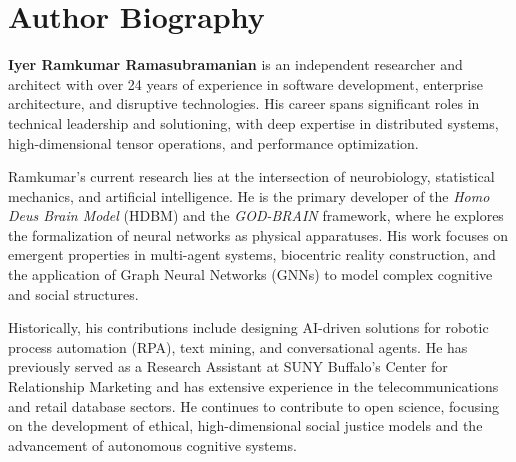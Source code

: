 \documentclass[12pt]{article}
\begin{document}
\section*{Author Biography}

\noindent \textbf{Iyer Ramkumar Ramasubramanian} is an independent researcher and architect with over 24 years of experience in software development, enterprise architecture, and disruptive technologies. His career spans significant roles in technical leadership and solutioning, with deep expertise in distributed systems, high-dimensional tensor operations, and performance optimization.

\medskip

\noindent Ramkumar’s current research lies at the intersection of neurobiology, statistical mechanics, and artificial intelligence. He is the primary developer of the \textit{Homo Deus Brain Model} (HDBM) and the \textit{GOD-BRAIN} framework, where he explores the formalization of neural networks as physical apparatuses. His work focuses on emergent properties in multi-agent systems, biocentric reality construction, and the application of Graph Neural Networks (GNNs) to model complex cognitive and social structures.

\medskip

\noindent Historically, his contributions include designing AI-driven solutions for robotic process automation (RPA), text mining, and conversational agents. He has previously served as a Research Assistant at SUNY Buffalo’s Center for Relationship Marketing and has extensive experience in the telecommunications and retail database sectors. He continues to contribute to open science, focusing on the development of ethical, high-dimensional social justice models and the advancement of autonomous cognitive systems.
\end{document}
